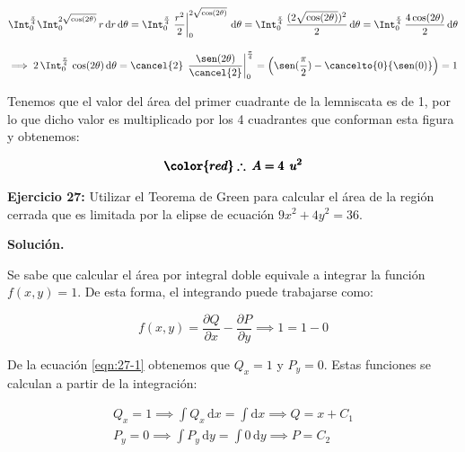 \documentclass[12pt]{article}
\begin{document}
\begin{align*}
	\Int_{0}^{\frac{\pi}{4}} \Int_{0}^{2\sqrt{\cos(2\theta)}}\, r\,\mathrm{d}r\,\mathrm{d}\theta = \Int_{0}^{\frac{\pi}{4}} \left.\frac{r^2}{2}\right|_{0}^{2\sqrt{\cos(2\theta)}}\,\mathrm{d}\theta = \Int_{0}^{\frac{\pi}{4}}\,\frac{(2\sqrt{\cos(2\theta)})^2}{2}\,\mathrm{d}\theta = \Int_{0}^{\frac{\pi}{4}}\, \frac{4\cos(2\theta)}{2}\,\mathrm{d}\theta
\end{align*}

\begin{align*}
	\implies 2\,\Int_{0}^{\frac{\pi}{4}}\, \cos(2\theta)\,\mathrm{d}\theta = \cancel{2}\,\left.\frac{\sen(2\theta)}{\cancel{2}}\right|_{0}^{\frac{\pi}{4}} = \left(\sen(\frac{\pi}{2}) - \cancelto{0}{\sen(0)}\right) = 1
\end{align*}

\noindent Tenemos que el valor del área del primer cuadrante de la lemniscata es de 1, por lo que dicho valor es multiplicado por los 4 cuadrantes que conforman esta figura y obtenemos:

\begin{align*}
	\pmb{\color{red} \therefore\: A = 4\: \: u^2}
\end{align*}

\noindent \textbf{Ejercicio 27:} Utilizar el Teorema de Green para calcular el área de la región cerrada que es limitada por la elipse de ecuación $9x^2 + 4y^2 = 36$.

\vspace{5mm}

\noindent \textbf{Solución.}

\vspace{3mm}

\noindent Se sabe que calcular el área por integral doble equivale a integrar la función $f(x, y) = 1$. De esta forma, el integrando puede trabajarse como:

\begin{equation}\label{eqn:27-1}\tag{1}
	f(x, y) = \frac{\partial Q}{\partial x} - \frac{\partial P}{\partial y} \implies 1 = 1 - 0
\end{equation}

\noindent De la ecuación \eqref{eqn:27-1} obtenemos que $Q_x = 1$ y $P_y = 0$. Estas funciones se calculan a partir de la integración:

\begin{align*}
	Q_x = 1 \implies \int Q_x\, \mathrm{d}x = \int \mathrm{d}x \implies Q = x + C_1 \\
	P_y = 0 \implies \int P_y\, \mathrm{d}y = \int 0\, \mathrm{d}y \implies P = C_2 \\
\end{align*}
\end{document}
